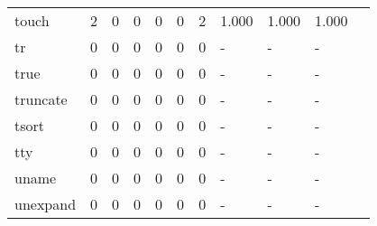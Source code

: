 \begin{longtable}{lp{1.10cm}p{1.10cm}p{1.10cm}p{1.10cm}p{1.10cm}p{1.10cm}p{1.10cm}p{1.10cm}p{1.10cm}p{1.10cm}}
touch     &                      2 &                                  0 &                                 0 &                                0 &                                 0 &                               2 &                          1.000 &                                 1.000 &                               1.000 \\
tr        &                      0 &                                  0 &                                 0 &                                0 &                                 0 &                               0 &                              - &                                     - &                                   - \\
true      &                      0 &                                  0 &                                 0 &                                0 &                                 0 &                               0 &                              - &                                     - &                                   - \\
truncate  &                      0 &                                  0 &                                 0 &                                0 &                                 0 &                               0 &                              - &                                     - &                                   - \\
tsort     &                      0 &                                  0 &                                 0 &                                0 &                                 0 &                               0 &                              - &                                     - &                                   - \\
tty       &                      0 &                                  0 &                                 0 &                                0 &                                 0 &                               0 &                              - &                                     - &                                   - \\
uname     &                      0 &                                  0 &                                 0 &                                0 &                                 0 &                               0 &                              - &                                     - &                                   - \\
unexpand  &                      0 &                                  0 &                                 0 &                                0 &                                 0 &                               0 &                              - &                                     - &                                   - \\

\end{longtable}
